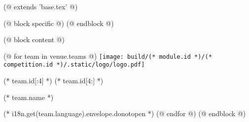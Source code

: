 (@ extends 'base.tex' @)

(@ block specific @)
    \geometry{paper=c5paper, landscape}
(@ endblock @)

(@ block content @)
    \pagestyle{empty}
    \centering

    (@ for team in venue.teams @)
        \texttt{[image: build/(* module.id *)/(* competition.id *)/.static/logo/logo.pdf]}%
        \vspace*{5mm}

        \fontsize{60}{0}\selectfont%
        (* team.id[:4] *)%
        \fontsize{80}{0}\selectfont%
        (* team.id[4:] *)%

        \vspace{5mm}
        \fontsize{15}{0}\selectfont
        (* team.name *)

        \vspace{15mm}
        \normalsize
        (* i18n.get(team.language).envelope.donotopen *)
        \newpage
    (@ endfor @)
(@ endblock @)
